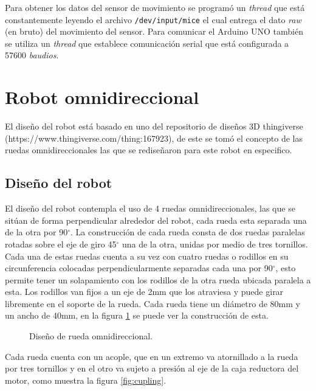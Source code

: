 \documentclass{iccmemoria}
\begin{document}
Para obtener los datos del sensor de movimiento se programó un \emph{thread} que está constantemente leyendo el archivo \texttt{/dev/input/mice} el cual entrega el dato \emph{raw} (en bruto) del movimiento del sensor. Para comunicar el Arduino UNO también se utiliza un \emph{thread} que establece comunicación serial  que está configurada a 57600 \emph{baudios}.\\

\section{Robot omnidireccional}

El diseño del robot está basado en uno del repositorio de diseños 3D thingiverse (https://www.thingiverse.com/thing:167923), de este se tomó el concepto de las ruedas omnidireccionales las que se rediseñaron para este robot en especifico.\\

\subsection{Diseño del robot}

El diseño del robot contempla el uso de 4 ruedas omnidireccionales, las que se sitúan de forma perpendicular alrededor del robot, cada rueda esta separada una de la otra por 90$^{\circ}$. La construcción de cada rueda consta de dos ruedas paralelas rotadas sobre el eje de giro 45$^{\circ}$ una de la otra, unidas por medio de tres tornillos. Cada una de estas ruedas cuenta a su vez con cuatro ruedas o rodillos en su circunferencia colocadas perpendicularmente separadas cada una por 90$^{\circ}$, esto permite tener un solapamiento con los rodillos de la otra rueda ubicada paralela a esta. Los rodillos van fijos a un eje de 2mm que los atraviesa y puede girar libremente en el soporte de la rueda. Cada rueda tiene un diámetro de 80mm y un ancho de 40mm, en la figura \ref{fig:image_omni_whell_2} se puede ver la construcción de esta.\\

\begin{figure}[H]
  \centering
  
  \caption[Rueda omnidireccional.]{Diseño de rueda omnidireccional.}
  \label{fig:image_omni_whell_2}
\end{figure}

Cada rueda cuenta con un acople, que en un extremo va atornillado a la rueda por tres tornillos y en el otro va sujeto a presión al eje de la caja reductora del motor, como muestra la figura \ref{fig:cupling}.\\
\end{document}

